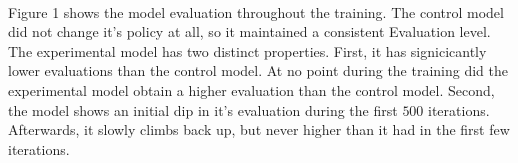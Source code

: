 \documentclass[12pt]{article}
\begin{document}
\paragraph{}
Figure 1 shows the model evaluation throughout the training.
The control model did not change it's policy at all, so it maintained a consistent Evaluation level.
The experimental model has two distinct properties.
First, it has signicicantly lower evaluations than the control model.
At no point during the training did the experimental model obtain a higher evaluation than the control model.
Second, the model shows an initial dip in it's evaluation during the first $500$ iterations.
Afterwards, it slowly climbs back up, but never higher than it had in the first few iterations.




\newpage


\end{document}
